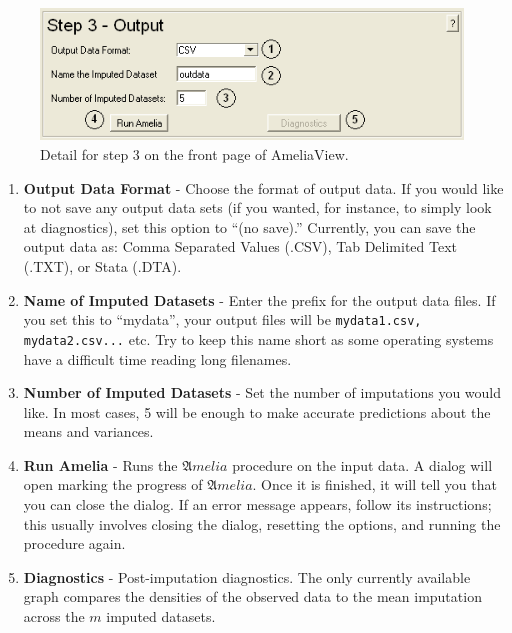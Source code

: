 \documentclass[12pt,titlepage]{article}
\begin{document}
\begin{figure}[ht]
  \centering \includegraphics[scale=.75]{step3.png}
  \caption{Detail for step 3 on the front page of AmeliaView.}
\end{figure}
\begin{enumerate}
\item \textbf{Output Data Format} - Choose the format of output data.
  If you would like to not save any output data sets (if you wanted,
  for instance, to simply look at diagnostics), set this option to
  ``(no save).''  Currently, you can save the output data as: Comma
  Separated Values (.CSV), Tab Delimited Text (.TXT), or Stata (.DTA).
\item \textbf{Name of Imputed Datasets} - Enter the prefix for the
  output data files.  If you set this to ``mydata'', your output files
  will be \texttt{mydata1.csv, mydata2.csv...} etc.  Try to keep this
  name short as some operating systems have a difficult time reading
  long filenames.
\item \textbf{Number of Imputed Datasets} - Set the number of
  imputations you would like.  In most cases, 5 will be enough to make
  accurate predictions about the means and variances.
\item \textbf{Run Amelia} - Runs the ${\mathfrak Amelia}$ procedure on
  the input data.  A dialog will open marking the progress of
  ${\mathfrak Amelia}$.  Once it is finished, it will tell you that
  you can close the dialog.  If an error message appears, follow its
  instructions; this usually involves closing the dialog, resetting
  the options, and running the procedure again.
\item \textbf{Diagnostics} - Post-imputation diagnostics.  The only
  currently available graph compares the densities of the observed
  data to the mean imputation across the $m$ imputed datasets.
\end{enumerate}
\end{document}
